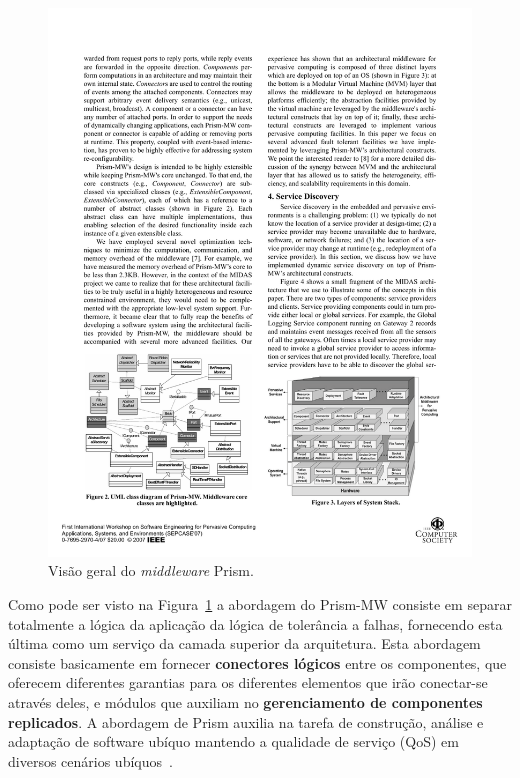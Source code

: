 \begin{figure}[htbp]
	\centering
		\includegraphics[width=.7\textwidth]{figuras/prism.pdf}
	\caption{Visão geral do \emph{middleware} Prism.}
	\label{fig:prism}
\end{figure}

Como pode ser visto na Figura~\ref{fig:prism} a abordagem do Prism-MW consiste em separar totalmente a lógica da aplicação da lógica de tolerância a falhas, fornecendo esta última como um serviço da camada superior da arquitetura. Esta abordagem consiste basicamente em fornecer \textbf{conectores lógicos} entre os componentes, que oferecem diferentes garantias para os diferentes elementos que irão conectar-se através deles, e módulos que auxiliam no \textbf{gerenciamento de componentes replicados}. A abordagem de Prism auxilia na tarefa de construção, análise e adaptação de software ubíquo mantendo a qualidade de serviço (QoS) em diversos cenários ubíquos~\cite{Seo07}.


% 


